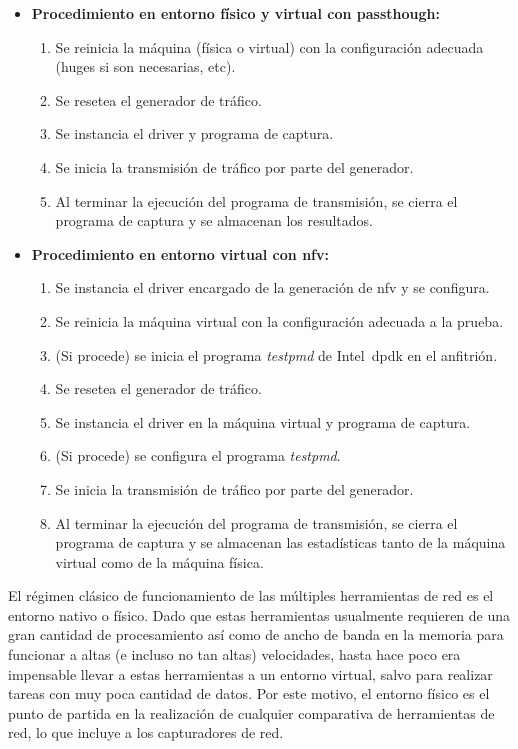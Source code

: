 \begin{itemize}
\item \textbf{Procedimiento en entorno físico y virtual con \gls{passthough}:}
\begin{enumerate}
\item Se reinicia la máquina (física o virtual) con la configuración adecuada (\glspl{huge} si son necesarias, etc).
\item Se resetea el generador de tráfico.
\item Se instancia el driver y programa de captura.
\item Se inicia la transmisión de tráfico por parte del generador.
\item Al terminar la ejecución del programa de transmisión, se cierra el programa de captura y se almacenan los resultados.
\end{enumerate}

\item \textbf{Procedimiento en entorno virtual con \gls{nfv}:}
\begin{enumerate}
\item Se instancia el driver encargado de la generación de \gls{nfv} y se configura.
\item Se reinicia la máquina virtual con la configuración adecuada a la prueba.
\item (Si procede) se inicia el programa \textit{testpmd} de Intel~\gls{dpdk} en el anfitrión.
\item Se resetea el generador de tráfico.
\item Se instancia el driver en la máquina virtual y programa de captura.
\item (Si procede) se configura el programa \textit{testpmd}.
\item Se inicia la transmisión de tráfico por parte del generador.
\item Al terminar la ejecución del programa de transmisión, se cierra el programa de captura y se almacenan las estadísticas tanto de la máquina virtual como de la máquina física.
\end{enumerate}

\end{itemize}


El régimen clásico de funcionamiento de las múltiples herramientas de red es el entorno nativo o físico. Dado que estas herramientas usualmente requieren de una gran cantidad de procesamiento así como de ancho de banda en la memoria para funcionar a altas (e incluso no tan altas) velocidades, hasta hace poco era impensable llevar a estas herramientas a un entorno virtual, salvo para realizar tareas con muy poca cantidad de datos.
Por este motivo, el entorno físico es el punto de partida en la realización de cualquier comparativa de herramientas de red, lo que incluye a los capturadores de red.

